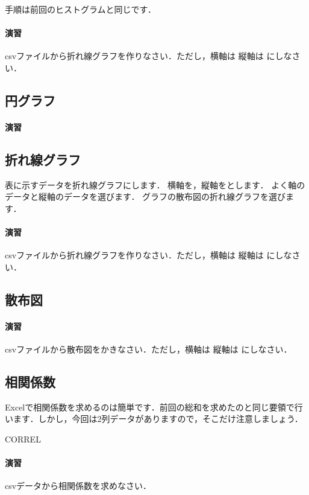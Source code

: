 \documentclass[12pt, a4j]{jsreport}
\begin{document}
手順は前回のヒストグラムと同じです．

\paragraph{演習}
csvファイルから折れ線グラフを作りなさい．ただし，横軸は 縦軸は にしなさい．

\subsection{円グラフ}

\paragraph{演習}


\subsection{折れ線グラフ}

表に示すデータを折れ線グラフにします．
横軸を，縦軸をとします．
よく軸のデータと縦軸のデータを選びます．
グラフの散布図の折れ線グラフを選びます．

\paragraph{演習}
csvファイルから折れ線グラフを作りなさい．ただし，横軸は 縦軸は にしなさい．


\subsection{散布図}

\paragraph{演習}

csvファイルから散布図をかきなさい．ただし，横軸は 縦軸は にしなさい．


\subsection{相関係数}

Excelで相関係数を求めるのは簡単です．前回の総和を求めたのと同じ要領で行います．しかし，今回は2列データがありますので，そこだけ注意しましょう．

CORREL

\paragraph{演習}
csvデータから相関係数を求めなさい．
\end{document}
